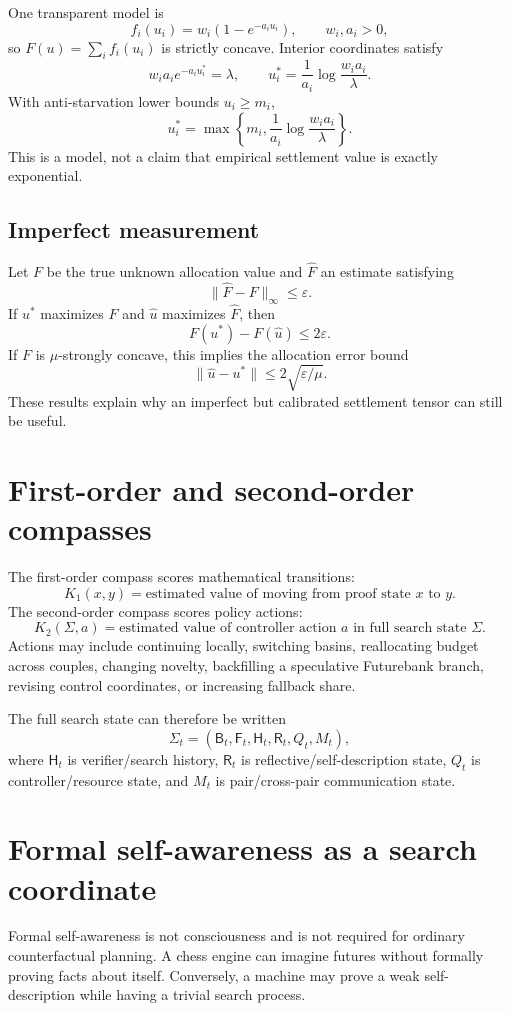 \documentclass[11pt]{article}
\newcommand{\Bank}{\mathsf{B}}
\newcommand{\Future}{\mathsf{F}}
\newcommand{\Hist}{\mathsf{H}}
\newcommand{\State}{\Sigma}
\newcommand{\eps}{\varepsilon}
\begin{document}
One transparent model is
\[
f_i(u_i)=w_i(1-e^{-a_i u_i}),\qquad w_i,a_i>0,
\]
so $F(u)=\sum_i f_i(u_i)$ is strictly concave. Interior coordinates satisfy
\[
w_i a_i e^{-a_i u_i^*}=\lambda,
\qquad
u_i^*=\frac1{a_i}\log\frac{w_i a_i}{\lambda}.
\]
With anti-starvation lower bounds $u_i\ge m_i$,
\[
u_i^*=\max\left\{m_i,\frac1{a_i}\log\frac{w_i a_i}{\lambda}\right\}.
\]
This is a model, not a claim that empirical settlement value is exactly exponential.

\subsection{Imperfect measurement}

Let $F$ be the true unknown allocation value and $\widehat F$ an estimate satisfying
\[
\|\widehat F-F\|_\infty\le\eps.
\]
If $u^*$ maximizes $F$ and $\widehat u$ maximizes $\widehat F$, then
\[
F(u^*)-F(\widehat u)\le 2\eps.
\]
If $F$ is $\mu$-strongly concave, this implies the allocation error bound
\[
\|\widehat u-u^*\|\le 2\sqrt{\eps/\mu}.
\]
These results explain why an imperfect but calibrated settlement tensor can still be useful.

\section{First-order and second-order compasses}

The first-order compass scores mathematical transitions:
\[
K_1(x,y)=\text{estimated value of moving from proof state $x$ to $y$}.
\]
The second-order compass scores policy actions:
\[
K_2(\State,a)=\text{estimated value of controller action $a$ in full search state $\State$}.
\]
Actions may include continuing locally, switching basins, reallocating budget across couples, changing novelty, backfilling a speculative Futurebank branch, revising control coordinates, or increasing fallback share.

The full search state can therefore be written
\[
\State_t=(\Bank_t,\Future_t,\Hist_t,\mathsf R_t,Q_t,M_t),
\]
where $\Hist_t$ is verifier/search history, $\mathsf R_t$ is reflective/self-description state, $Q_t$ is controller/resource state, and $M_t$ is pair/cross-pair communication state.

\section{Formal self-awareness as a search coordinate}

Formal self-awareness is not consciousness and is not required for ordinary counterfactual planning. A chess engine can imagine futures without formally proving facts about itself. Conversely, a machine may prove a weak self-description while having a trivial search process.
\end{document}
